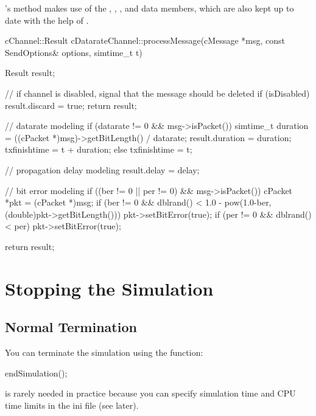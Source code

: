 's  method makes use of
the , , , and  data
members, which are also kept up to date with the help of
.

\begin{cpp}
cChannel::Result cDatarateChannel::processMessage(cMessage *msg,
                    const SendOptions& options, simtime_t t)
{
    Result result;

    // if channel is disabled, signal that the message should be deleted
    if (isDisabled) {
        result.discard = true;
        return result;
    }

    // datarate modeling
    if (datarate != 0 && msg->isPacket()) {
        simtime_t duration = ((cPacket *)msg)->getBitLength() / datarate;
        result.duration = duration;
        txfinishtime = t + duration;
    }
    else {
        txfinishtime = t;
    }

    // propagation delay modeling
    result.delay = delay;

    // bit error modeling
    if ((ber != 0 || per != 0) && msg->isPacket()) {
        cPacket *pkt = (cPacket *)msg;
        if (ber != 0 && dblrand() < 1.0 - pow(1.0-ber, (double)pkt->getBitLength()))
            pkt->setBitError(true);
        if (per != 0 && dblrand() < per)
            pkt->setBitError(true);
    }

    return result;
}
\end{cpp}



\section{Stopping the Simulation}
\label{sec:simple-modules:stopping}

\subsection{Normal Termination}
\label{sec:simple-modules:endsimulation}

You can terminate the simulation using the  function:

\begin{cpp}
endSimulation();
\end{cpp}

 is rarely needed in practice because you
can specify simulation time and CPU time limits
in the ini file (see later).

